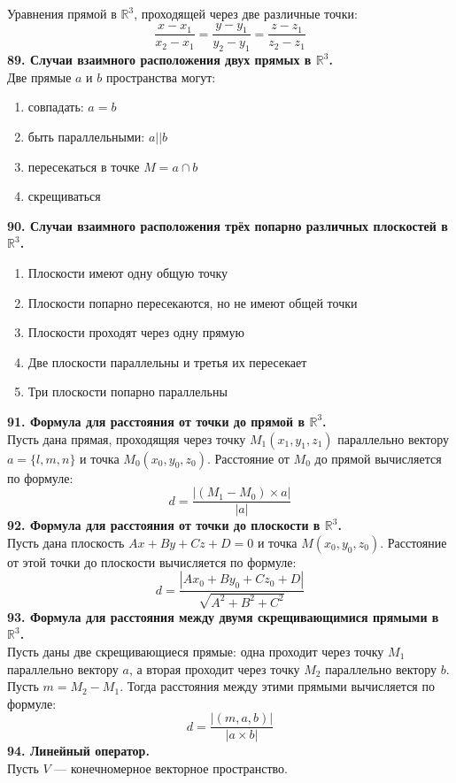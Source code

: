 \documentclass{article}
\begin{document}
   Уравнения прямой в $\mathbb{R}^3$, проходящей через две различные точки:
   $$
       \frac{x - x_1}{x_2 - x_1} = \frac{y - y_1}{y_2 - y_1} = \frac{z - z_1}{z_2 - z_1}
   $$
\newline
\newline
\textbf{89. Случаи взаимного расположения двух прямых в $\mathbb{R}^3$.} \\
   Две прямые $a$ и $b$ пространства могут:
   \begin{enumerate}
       \item совпадать: $a = b$
       \item быть параллельными: $a || b$
       \item пересекаться в точке $M = a \cap b$
       \item скрещиваться
   \end{enumerate}
\noindent
\textbf{90. Случаи взаимного расположения трёх попарно различных плоскостей в $\mathbb{R}^3$.}
   \begin{enumerate}
       \item Плоскости имеют одну общую точку
       \item Плоскости попарно пересекаются, но не имеют общей точки
       \item Плоскости проходят через одну прямую
       \item Две плоскости параллельны и третья их пересекает
       \item Три плоскости попарно параллельны
   \end{enumerate}
\noindent
\textbf{91. Формула для расстояния от точки до прямой в $\mathbb{R}^3$.}\\
   Пусть дана прямая, проходящяя через точку $M_1(x_1, y_1, z_1)$ параллельно вектору $a = \{l, m, n\}$ и точка $M_0(x_0, y_0, z_0)$. Расстояние от $M_0$ до прямой вычисляется по формуле:
   $$
       d = \frac{|(M_1 - M_0) \times a|}{|a|}
   $$
\newline
\newline
\textbf{92. Формула для расстояния от точки до плоскости в $\mathbb{R}^3$.}\\
   Пусть дана плоскость $Ax + By + Cz + D = 0$ и точка $M(x_0, y_0, z_0)$. Расстояние от этой точки до плоскости вычисляется по формуле:
   $$
       d = \frac{|Ax_0 + By_0 + Cz_0 + D|}{\sqrt{A^2 + B^2 + C^2}}
   $$
\newline
\newline
\textbf{93. Формула для расстояния между двумя скрещивающимися прямыми в $\mathbb{R}^3$.}\\
   Пусть даны две скрещивающиеся прямые: одна проходит через точку $M_1$ параллельно вектору $a$, а вторая проходит через точку $M_2$ параллельно вектору $b$. Пусть $m = M_2 - M_1$. Тогда расстояния между этими прямыми вычисляется по формуле:
   $$
       d = \frac{|(m, a, b)|}{|a \times b|}
   $$
\newline
\newline
\textbf{94. Линейный оператор.}\\
Пусть $V$ --- конечномерное векторное пространство.
\end{document}
